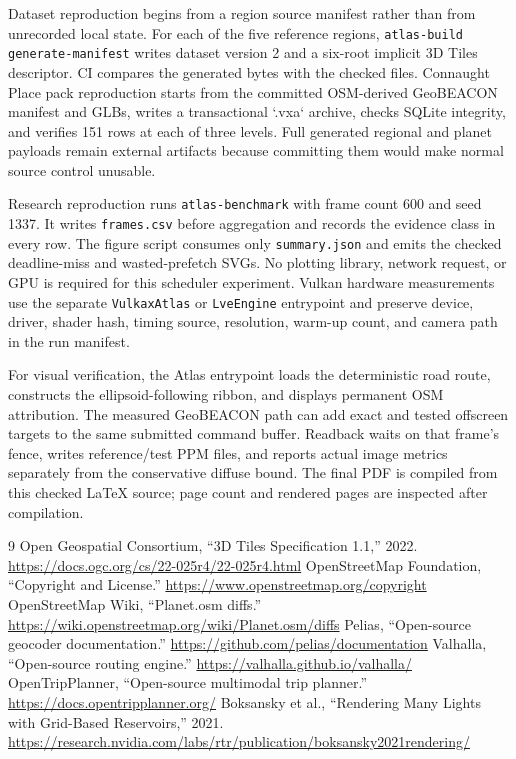 \documentclass[12pt]{article}
\begin{document}
Dataset reproduction begins from a region source manifest rather than from unrecorded local state.
For each of the five reference regions, \texttt{atlas-build generate-manifest} writes dataset
version 2 and a six-root implicit 3D Tiles descriptor. CI compares the generated bytes with the
checked files. Connaught Place pack reproduction starts from the committed OSM-derived GeoBEACON
manifest and GLBs, writes a transactional `.vxa` archive, checks SQLite integrity, and verifies 151
rows at each of three levels. Full generated regional and planet payloads remain external artifacts
because committing them would make normal source control unusable.

Research reproduction runs \texttt{atlas-benchmark} with frame count 600 and seed 1337. It writes
\texttt{frames.csv} before aggregation and records the evidence class in every row. The figure
script consumes only \texttt{summary.json} and emits the checked deadline-miss and wasted-prefetch
SVGs. No plotting library, network request, or GPU is required for this scheduler experiment.
Vulkan hardware measurements use the separate \texttt{VulkaxAtlas} or \texttt{LveEngine}
entrypoint and preserve device, driver, shader hash, timing source, resolution, warm-up count, and
camera path in the run manifest.

For visual verification, the Atlas entrypoint loads the deterministic road route, constructs the
ellipsoid-following ribbon, and displays permanent OSM attribution. The measured GeoBEACON path can
add exact and tested offscreen targets to the same submitted command buffer. Readback waits on that
frame's fence, writes reference/test PPM files, and reports actual image metrics separately from
the conservative diffuse bound. The final PDF is compiled from this checked \LaTeX{} source; page
count and rendered pages are inspected after compilation.

\clearpage
\begin{thebibliography}{9}
 Open Geospatial Consortium, ``3D Tiles Specification 1.1,'' 2022.
\url{https://docs.ogc.org/cs/22-025r4/22-025r4.html}
 OpenStreetMap Foundation, ``Copyright and License.''
\url{https://www.openstreetmap.org/copyright}
 OpenStreetMap Wiki, ``Planet.osm diffs.''
\url{https://wiki.openstreetmap.org/wiki/Planet.osm/diffs}
 Pelias, ``Open-source geocoder documentation.''
\url{https://github.com/pelias/documentation}
 Valhalla, ``Open-source routing engine.''
\url{https://valhalla.github.io/valhalla/}
 OpenTripPlanner, ``Open-source multimodal trip planner.''
\url{https://docs.opentripplanner.org/}
 Boksansky et al., ``Rendering Many Lights with Grid-Based Reservoirs,'' 2021.
\url{https://research.nvidia.com/labs/rtr/publication/boksansky2021rendering/}
\end{thebibliography}
\end{document}
